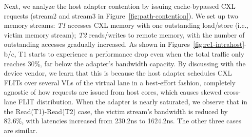 
Next, we analyze the host adapter contention by issuing cache-bypassed CXL requests (stream2 and stream3 in Figure~\ref{fig:path-contention}). We set up two memory streams: \emph{T1} accesses CXL memory with one outstanding load/store (i.e., victim memory stream); \emph{T2} reads/writes to remote memory, with the number of outstanding accesses gradually increased.
As shown in Figures~\ref{fig:rc1-intrahost}-b/c, T1 starts to experience a performance drop even when the total traffic only reaches 30\%, far below the adapter's bandwidth capacity. By discussing with the device vendor, we learn that this is because the host adapter schedules CXL FLITs over several VLs of the virtual lane in a best-effort fashion, completely agnostic of how requests are issued from host cores, which causes skewed cross-lane FLIT distribution.
When the adapter is nearly saturated, we observe that in the Read(T1)-Read(T2) case, the victim stream's bandwidth is reduced by 82.6\%, with latencies increased from 230.2ns to 1624.2ns. The other three cases are similar.


